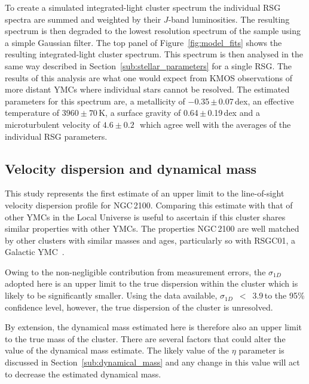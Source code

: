 To create a simulated integrated-light cluster spectrum the individual RSG spectra are summed and weighted by their $J$-band luminosities.
The resulting spectrum is then degraded to the lowest resolution spectrum of the sample using a simple Gaussian filter.
The top panel of Figure~\ref{fig:model_fits} shows the resulting integrated-light cluster spectrum.
This spectrum is then analysed in the same way described in Section~\ref{sub:stellar_parameters} for a single RSG.
The results of this analysis are what one would expect from KMOS observations of more distant YMCs where individual stars cannot be resolved.
The estimated parameters for this spectrum are, a metallicity of $-$0.35\,$\pm$\,0.07\,dex, an effective temperature of $3960\pm70\,$K,
a surface gravity of 0.64\,$\pm$\,0.19\,dex and a microturbulent velocity of $4.6\pm0.2\,$\kms~which agree well with the averages of the individual RSG parameters.


\subsection{Velocity dispersion and dynamical mass} %
\label{sub:velocity_dispersion_Mdyn}

This study represents the first estimate of an upper limit to the line-of-sight velocity dispersion profile for NGC\,2100.
Comparing this estimate with that of other YMCs in the Local Universe is useful to ascertain if this cluster shares similar properties with other YMCs.
The properties NGC\,2100 are well matched by other clusters with similar masses and ages, particularly so with RSGC01, a Galactic YMC~\citep{2007ApJ...671..781D}.

Owing to the non-negligible contribution from measurement errors, the $\sigma_{1D}$ adopted here is an upper limit to the true dispersion within the cluster which is likely to be significantly smaller.
Using the data available, $\sigma_{1D}$~$<$~3.9\,\kms to the 95\% confidence level, however,
the true dispersion of the cluster is unresolved.

By extension, the dynamical mass estimated here is therefore also an upper limit to the true mass of the cluster.
There are several factors that could alter the value of the dynamical mass estimate.
The likely value of the $\eta$ parameter is discussed in Section~\ref{sub:dynamical_mass} and any change in this value will act to decrease the estimated dynamical mass.

